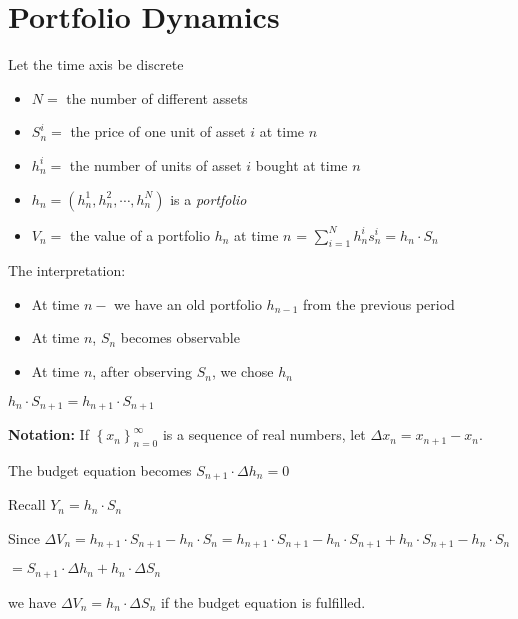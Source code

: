 \section{Portfolio Dynamics}
\noindent Let the time axis be discrete
\par\bigskip
\begin{defo}[]{}
  \begin{itemize}
    \item $N = $ the number of different assets
    \item $S_n^i = $ the price of one unit of asset $i$ at time $n$
    \item $h_n^i = $ the number of units of asset $i$ bought at time $n$
    \item $h_n = (h_n^1,h_n^2,\cdots,h_n^N)$ is a \textit{portfolio}
    \item $V_n = $ the value of a portfolio $h_n$ at time $n$ = $\sum_{i=1}^{N}h_n^is_n^i = h_n\cdot S_n$
  \end{itemize}
\end{defo}
\par\bigskip
\noindent The interpretation:\par
\begin{itemize}
  \item At time $n-$ we have an old portfolio $h_{n-1}$ from the previous period
  \item At time $n$, $S_n$ becomes observable
  \item At time $n$, after observing $S_n$, we chose $h_n$
\end{itemize}
\par\bigskip
\begin{defo}{}
  $h_n\cdot S_{n+1} = h_{n+1}\cdot S_{n+1}$
  \par\bigskip
  \noindent\textbf{Notation:} If $\left\{x_n\right\}_{n=0}^\infty$ is a sequence of real numbers, let $\Delta x_n = x_{n+1}-x_n$.\par
  \noindent The budget equation becomes $S_{n+1}\cdot\Delta h_n = 0$ 
\end{defo}
\par\bigskip
\noindent Recall $Y_n = h_n\cdot S_n$\par
\noindent Since $\Delta V_n = h_{n+1}\cdot S_{n+1}-h_n\cdot S_n = h_{n+1}\cdot S_{n+1}-h_n\cdot S_{n+1}+h_n\cdot S_{n+1}-h_n\cdot S_n$\par
\noindent $= S_{n+1}\cdot\Delta h_n + h_n\cdot\Delta S_n$\par
\noindent we have $\Delta V_n = h_n\cdot\Delta S_n$ if the budget equation is fulfilled.
